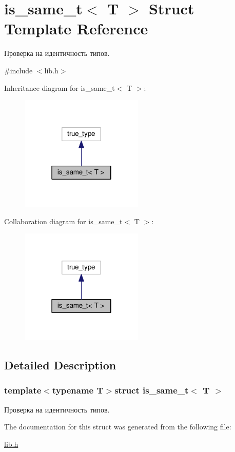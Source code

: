\hypertarget{structis__same__t_3_01T_01_4}{\section{is\-\_\-same\-\_\-t$<$ T $>$ Struct Template Reference}
\label{structis__same__t_3_01T_01_4}
}


Проверка на идентичность типов.  




{\ttfamily \#include $<$lib.\-h$>$}



Inheritance diagram for is\-\_\-same\-\_\-t$<$ T $>$\-:
\nopagebreak
\begin{figure}[H]
\begin{center}
\leavevmode
\includegraphics[width=166pt]{structis__same__t_3_01T_01_4__inherit__graph}
\end{center}
\end{figure}


Collaboration diagram for is\-\_\-same\-\_\-t$<$ T $>$\-:
\nopagebreak
\begin{figure}[H]
\begin{center}
\leavevmode
\includegraphics[width=166pt]{structis__same__t_3_01T_01_4__coll__graph}
\end{center}
\end{figure}


\subsection{Detailed Description}
\subsubsection*{template$<$typename T$>$struct is\-\_\-same\-\_\-t$<$ T $>$}

Проверка на идентичность типов. 

The documentation for this struct was generated from the following file\-:\begin{DoxyCompactItemize}
\item 
\hyperlink{lib_8h}{lib.\-h}\end{DoxyCompactItemize}
